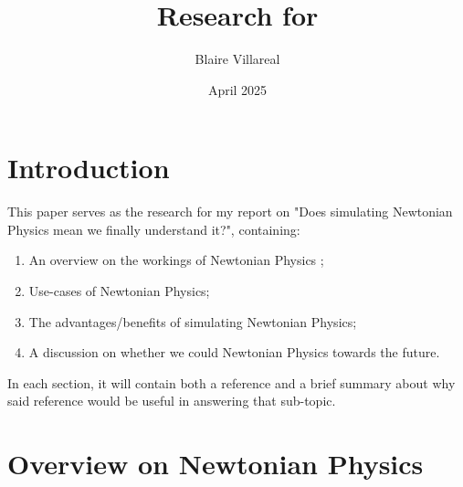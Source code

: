 \documentclass[12pt]{article}
\title{Research for \say{Does simulating Newtonian Physics mean we finally understand it?}}
\author{Blaire Villareal}
\date{April 2025}
\begin{document}
\maketitle

\raggedright %


\section*{Introduction}

This paper serves as the research for my report on "Does simulating Newtonian Physics mean we finally understand it?",
containing: 

\begin{enumerate}
    \item An overview on the workings of Newtonian Physics \parencite{einstein};
    \item Use-cases of Newtonian Physics;
    \item The advantages/benefits of simulating Newtonian Physics;
    \item A discussion on whether we could  Newtonian Physics towards the future.
\end{enumerate}

\par 

In each section, it will contain both a reference and a brief summary about why said reference
would be useful in answering that sub-topic.

\newpage


\section{Overview on Newtonian Physics}


\end{document}
